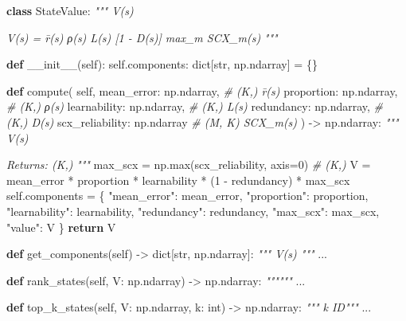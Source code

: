 \documentclass[
  12pt,
]{article}
\newenvironment{Shaded}{}{}
\newcommand{\BuiltInTok}[1]{\textcolor[rgb]{0.00,0.50,0.00}{#1}}
\newcommand{\CommentTok}[1]{\textcolor[rgb]{0.38,0.63,0.69}{\textit{#1}}}
\newcommand{\ControlFlowTok}[1]{\textcolor[rgb]{0.00,0.44,0.13}{\textbf{#1}}}
\newcommand{\DecValTok}[1]{\textcolor[rgb]{0.25,0.63,0.44}{#1}}
\newcommand{\FunctionTok}[1]{\textcolor[rgb]{0.02,0.16,0.49}{#1}}
\newcommand{\KeywordTok}[1]{\textcolor[rgb]{0.00,0.44,0.13}{\textbf{#1}}}
\newcommand{\NormalTok}[1]{#1}
\newcommand{\OperatorTok}[1]{\textcolor[rgb]{0.40,0.40,0.40}{#1}}
\newcommand{\StringTok}[1]{\textcolor[rgb]{0.25,0.44,0.63}{#1}}
\newcommand{\VariableTok}[1]{\textcolor[rgb]{0.10,0.09,0.49}{#1}}
\begin{document}
\begin{Shaded}
\begin{Highlighting}[]
\KeywordTok{class}\NormalTok{ StateValue:}
    \CommentTok{""" V(s) }

\CommentTok{    V(s) = r̄(s)  ρ(s)  L(s)  [1 {-} D(s)]  max\_m SCX\_m(s)}
\CommentTok{    """}

    \KeywordTok{def} \FunctionTok{\_\_init\_\_}\NormalTok{(}\VariableTok{self}\NormalTok{):}
        \VariableTok{self}\NormalTok{.components: }\BuiltInTok{dict}\NormalTok{[}\BuiltInTok{str}\NormalTok{, np.ndarray] }\OperatorTok{=}\NormalTok{ \{\}}

    \KeywordTok{def}\NormalTok{ compute(}
        \VariableTok{self}\NormalTok{,}
\NormalTok{        mean\_error: np.ndarray,        }\CommentTok{\# (K,) r̄(s)}
\NormalTok{        proportion: np.ndarray,        }\CommentTok{\# (K,) ρ(s)}
\NormalTok{        learnability: np.ndarray,      }\CommentTok{\# (K,) L(s)}
\NormalTok{        redundancy: np.ndarray,        }\CommentTok{\# (K,) D(s)}
\NormalTok{        scx\_reliability: np.ndarray    }\CommentTok{\# (M, K) SCX\_m(s)}
\NormalTok{    ) }\OperatorTok{{-}\textgreater{}}\NormalTok{ np.ndarray:}
        \CommentTok{""" V(s) }

\CommentTok{        Returns: (K,) }
\CommentTok{        """}
\NormalTok{        max\_scx }\OperatorTok{=}\NormalTok{ np.}\BuiltInTok{max}\NormalTok{(scx\_reliability, axis}\OperatorTok{=}\DecValTok{0}\NormalTok{)  }\CommentTok{\# (K,)}
\NormalTok{        V }\OperatorTok{=}\NormalTok{ mean\_error }\OperatorTok{*}\NormalTok{ proportion }\OperatorTok{*}\NormalTok{ learnability }\OperatorTok{*}\NormalTok{ (}\DecValTok{1} \OperatorTok{{-}}\NormalTok{ redundancy) }\OperatorTok{*}\NormalTok{ max\_scx}
        \VariableTok{self}\NormalTok{.components }\OperatorTok{=}\NormalTok{ \{}
            \StringTok{"mean\_error"}\NormalTok{: mean\_error,}
            \StringTok{"proportion"}\NormalTok{: proportion,}
            \StringTok{"learnability"}\NormalTok{: learnability,}
            \StringTok{"redundancy"}\NormalTok{: redundancy,}
            \StringTok{"max\_scx"}\NormalTok{: max\_scx,}
            \StringTok{"value"}\NormalTok{: V}
\NormalTok{        \}}
        \ControlFlowTok{return}\NormalTok{ V}

    \KeywordTok{def}\NormalTok{ get\_components(}\VariableTok{self}\NormalTok{) }\OperatorTok{{-}\textgreater{}} \BuiltInTok{dict}\NormalTok{[}\BuiltInTok{str}\NormalTok{, np.ndarray]:}
        \CommentTok{""" V(s) """}
\NormalTok{        ...}

    \KeywordTok{def}\NormalTok{ rank\_states(}\VariableTok{self}\NormalTok{, V: np.ndarray) }\OperatorTok{{-}\textgreater{}}\NormalTok{ np.ndarray:}
        \CommentTok{""""""}
\NormalTok{        ...}

    \KeywordTok{def}\NormalTok{ top\_k\_states(}\VariableTok{self}\NormalTok{, V: np.ndarray, k: }\BuiltInTok{int}\NormalTok{) }\OperatorTok{{-}\textgreater{}}\NormalTok{ np.ndarray:}
        \CommentTok{""" k  ID"""}
\NormalTok{        ...}
\end{Highlighting}
\end{Shaded}
\end{document}
